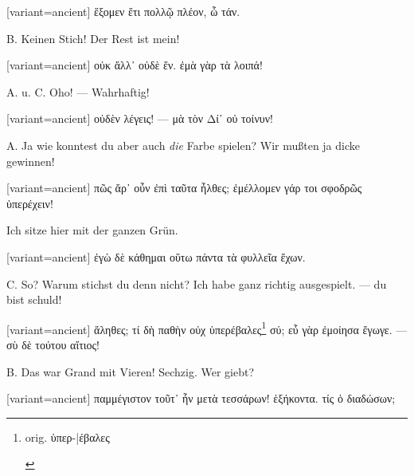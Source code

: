 \switchcolumn

\begin{greek}[variant=ancient]%
ἕξομεν ἔτι πολλῷ πλέον, ὦ τάν.

\end{greek}%
\switchcolumn*

B. Keinen Stich! Der Rest ist mein!

\switchcolumn

\begin{greek}[variant=ancient]%
οὐκ ἄλλ᾽ οὐδὲ ἕν. ἐμὰ γὰρ τὰ λοιπά!

\end{greek}%
\switchcolumn*

A. u. C. Oho! — Wahrhaftig!

\switchcolumn

\begin{greek}[variant=ancient]%
οὐδὲν λέγεις! — μὰ τὸν Δί᾽ οὐ τοίνυν!

\end{greek}%
\switchcolumn*

A. Ja wie konntest du aber auch \emph{die} Farbe spielen? Wir mußten
ja dicke gewinnen! 

\switchcolumn

\begin{greek}[variant=ancient]%
πῶς ἄρ᾽ οὖν ἐπὶ ταῦτα ἦλθες; ἐμέλλομεν γάρ τοι σφοδρῶς ὑπερέχειν!

\end{greek}%
\switchcolumn*

Ich sitze hier mit der ganzen Grün.

\switchcolumn

\begin{greek}[variant=ancient]%
ἐγὼ δὲ κάθημαι οὕτω πάντα τὰ φυλλεῖα ἔχων.

\end{greek}%
\switchcolumn*

C. So? Warum stichst du denn nicht? Ich habe ganz richtig aus\textcompwordmark{}gespielt.
— du bist schuld!

\switchcolumn

\begin{greek}[variant=ancient]%
ἄληθες; τί δὴ παθὴν οὐχ ὑπερέβαλες\footnote{\begin{latin}%
orig. \textgreek[variant=ancient]{ὑπερ-|έβαλες}\end{latin}%
} σύ; εὖ γὰρ ἐμοίησα ἔγωγε. — σὺ δὲ τούτου αἴτιος!

\end{greek}%
\switchcolumn*

B. Das war Grand mit Vieren! Sechzig. Wer giebt?

\switchcolumn

\begin{greek}[variant=ancient]%
παμμέγιστον τοῦτ᾽ ἦν μετὰ τεσσάρων! ἑξήκοντα. τίς ὁ διαδώσων;

\end{greek}%
